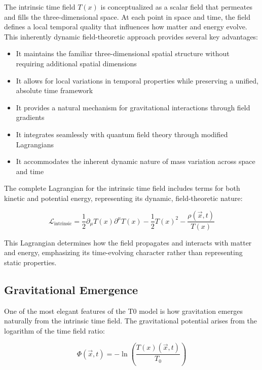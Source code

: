 \documentclass[12pt,a4paper]{article}
\newcommand{\Tfield}{T(x)}
\newcommand{\Tzero}{T_0}
\newcommand{\vecx}{\vec{x}}
\begin{document}
	The intrinsic time field \(\Tfield\) is conceptualized as a scalar field that permeates and fills the three-dimensional space. At each point in space and time, the field defines a local temporal quality that influences how matter and energy evolve. This inherently dynamic field-theoretic approach provides several key advantages:
	
	\begin{itemize}
		\item It maintains the familiar three-dimensional spatial structure without requiring additional spatial dimensions
		\item It allows for local variations in temporal properties while preserving a unified, absolute time framework
		\item It provides a natural mechanism for gravitational interactions through field gradients
		\item It integrates seamlessly with quantum field theory through modified Lagrangians
		\item It accommodates the inherent dynamic nature of mass variation across space and time
	\end{itemize}
	
	The complete Lagrangian for the intrinsic time field includes terms for both kinetic and potential energy, representing its dynamic, field-theoretic nature:
	
	\begin{equation}
		\mathcal{L}_{\text{intrinsic}} = \frac{1}{2}\partial_{\mu}\Tfield\partial^{\mu}\Tfield - \frac{1}{2}\Tfield^2 - \frac{\rho(\vecx,t)}{\Tfield}
	\end{equation}
	
	This Lagrangian determines how the field propagates and interacts with matter and energy, emphasizing its time-evolving character rather than representing static properties.
	
	\subsection{Gravitational Emergence}
	\label{subsec:gravitational_emergence_t0}
	
	One of the most elegant features of the T0 model is how gravitation emerges naturally from the intrinsic time field. The gravitational potential arises from the logarithm of the time field ratio:
	
	\begin{equation}
		\Phi(\vecx,t) = -\ln\left(\frac{\Tfield(\vecx,t)}{\Tzero}\right)
	\end{equation}
	
\end{document}
